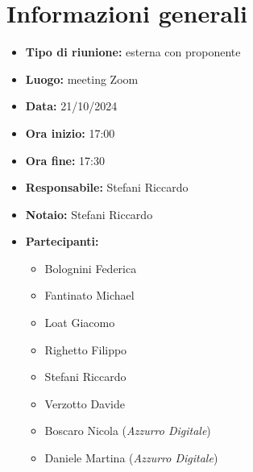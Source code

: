 \section{Informazioni generali}

\begin{itemize}
    \item \textbf{Tipo di riunione:} esterna con proponente
    \item \textbf{Luogo:} meeting Zoom
    \item \textbf{Data:} 21/10/2024
    \item \textbf{Ora inizio:} 17:00
    \item \textbf{Ora fine:} 17:30
    \item \textbf{Responsabile:} Stefani Riccardo
    \item \textbf{Notaio:} Stefani Riccardo
    \item \textbf{Partecipanti:}
    \begin{itemize}
        \renewcommand{\labelitemii}{--}
        \item Bolognini Federica
        \item Fantinato Michael
        \item Loat Giacomo
        \item Righetto Filippo
        \item Stefani Riccardo
        \item Verzotto Davide
        \item Boscaro Nicola (\emph{Azzurro Digitale})
        \item Daniele Martina (\emph{Azzurro Digitale})
    \end{itemize}
\end{itemize}